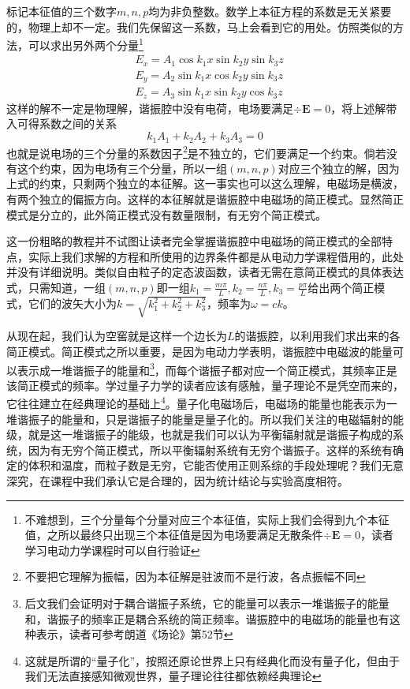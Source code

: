 \documentclass[../../main.tex]{subfiles}
\begin{document}
\begin{example}
\begin{solution}
        标记本征值的三个数字\(m,n,p\)均为非负整数。数学上本征方程的系数是无关紧要的，物理上却不一定。我们先保留这一系数，马上会看到它的用处。仿照类似的方法，可以求出另外两个分量\footnote{不难想到，三个分量每个分量对应三个本征值，实际上我们会得到九个本征值，之所以最终只出现三个本征值是因为电场要满足无散条件\(\div \bm{E}=0\)，读者学习电动力学课程时可以自行验证}
        \begin{equation}
            \begin{split}
                &E_x=A_1\cos k_1x\sin k_2y\sin k_3z \\
                &E_y=A_2\sin k_1x\cos k_2y\sin k_3z \\
                &E_z=A_3\sin k_1x\sin k_2y\cos k_3z
            \end{split}
        \end{equation}
        这样的解不一定是物理解，谐振腔中没有电荷，电场要满足\(\div \bm{E}=0\)，将上述解带入可得系数之间的关系
        \begin{equation}
            k_1A_1+k_2A_2+k_3A_3=0
        \end{equation}
        也就是说电场的三个分量的系数因子\footnote{不要把它理解为振幅，因为本征解是驻波而不是行波，各点振幅不同}是不独立的，它们要满足一个约束。倘若没有这个约束，因为电场有三个分量，所以一组\((m,n,p)\)对应三个独立的解，因为上式的约束，只剩两个独立的本征解。这一事实也可以这么理解，电磁场是横波，有两个独立的偏振方向。这样的本征解就是谐振腔中电磁场的简正模式。显然简正模式是分立的，此外简正模式没有数量限制，有无穷个简正模式。

        这一份粗略的教程并不试图让读者完全掌握谐振腔中电磁场的简正模式的全部特点，实际上我们求解的方程和所使用的边界条件都是从电动力学课程借用的，此处并没有详细说明。类似自由粒子的定态波函数，读者无需在意简正模式的具体表达式，只需知道，一组\((m,n,p)\)即一组\(k_1=\frac{m\pi}{L}, k_2=\frac{n\pi}{L}, k_3=\frac{p\pi}{L}\)给出两个简正模式，它们的波矢大小为\(k=\sqrt{k_1^2+k_2^2+k_3^2}\)，频率为\(\omega=ck\)。
    \end{solution}
\end{example}
从现在起，我们认为空窖就是这样一个边长为\(L\)的谐振腔，以利用我们求出来的各简正模式。简正模式之所以重要，是因为电动力学表明，谐振腔中电磁波的能量可以表示成一堆谐振子的能量和\footnote{后文我们会证明对于耦合谐振子系统，它的能量可以表示一堆谐振子的能量和，谐振子的频率正是耦合系统的简正频率。谐振腔中的电磁场的能量也有这种表示，读者可参考朗道《场论》第52节}，而每个谐振子都对应一个简正模式，其频率正是该简正模式的频率。学过量子力学的读者应该有感触，量子理论不是凭空而来的，它往往建立在经典理论的基础上\footnote{这就是所谓的“量子化”，按照还原论世界上只有经典化而没有量子化，但由于我们无法直接感知微观世界，量子理论往往都依赖经典理论}。量子化电磁场后，电磁场的能量也能表示为一堆谐振子的能量和，只是谐振子的能量是量子化的。所以我们关注的电磁辐射的能级，就是这一堆谐振子的能级，也就是我们可以认为平衡辐射就是谐振子构成的系统，因为有无穷个简正模式，所以平衡辐射系统有无穷个谐振子。这样的系统有确定的体积和温度，而粒子数是无穷，它能否使用正则系综的手段处理呢？我们无意深究，在课程中我们承认它是合理的，因为统计结论与实验高度相符。
\end{document}
